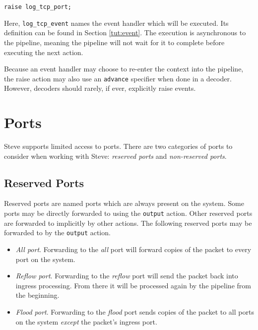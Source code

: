 \begin{lstlisting}
raise log_tcp_port;
\end{lstlisting}


Here, \texttt{log\_tcp\_event} names the event handler which will be executed. Its definition can be found in Section \ref{tut:event}. The execution is asynchronous to the pipeline, meaning the pipeline will not wait for it to complete before executing the next action.

Because an event handler may choose to re-enter the context into the pipeline, the raise action may also use an \texttt{advance} specifier when done in a decoder. However, decoders should rarely, if ever, explicitly raise events.

\section{Ports} \label{tut:ports}

Steve supports limited access to ports.
There are two categories of ports to consider when working with Steve: 
\textit{reserved ports} and
\textit{non-reserved ports}.

\subsection {Reserved Ports} \label{tut:reserved_ports}

Reserved ports are named ports which are always present on the system. Some ports may
be directly forwarded to using the \texttt{output} action. Other reserved ports 
are forwarded to implicitly by other actions.
The following reserved ports may be forwarded to by the \texttt{output} action.

\begin{itemize}
\item \emph{All port}. Forwarding to the \textit{all} port will forward copies of the packet to
every port on the system.

\item \emph{Reflow port}. Forwarding to the \textit{reflow} port will send the packet back into
ingress processing. From there it will be processed again by the pipeline from
the beginning.

\item \emph{Flood port}. Forwarding to the \textit{flood} port sends copies of the packet to all
ports on the system \textit{except} the packet's ingress port.
\end{itemize}

